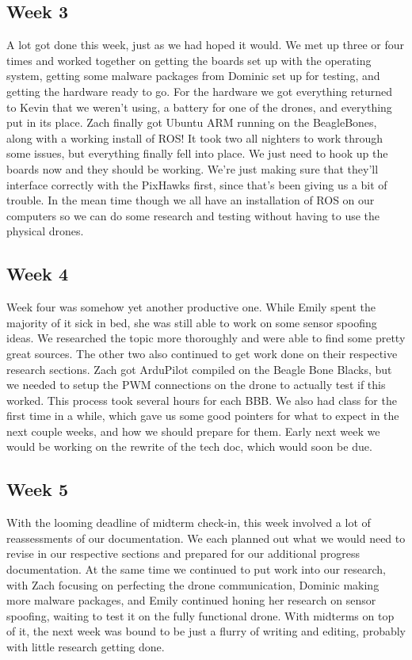 \documentclass[IEEEtran,letterpaper,10pt,notitlepage,draftclsnofoot,onecolumn]{article}
\begin{document}
\subsection{Week 3}
A lot got done this week, just as we had hoped it would. 
We met up three or four times and worked together on getting the boards set up with the operating system, getting some malware packages from Dominic set up for testing, and getting the hardware ready to go. 
For the hardware we got everything returned to Kevin that we weren't using, a battery for one of the drones, and everything put in its place.
Zach finally got Ubuntu ARM running on the BeagleBones, along with a working install of ROS! It took two all nighters to work through some issues, but everything finally fell into place.  
We just need to hook up the boards now and they should be working. 
We're just making sure that they'll interface correctly with the PixHawks first, since that's been giving us a bit of trouble. 
In the mean time though we all have an installation of ROS on our computers so we can do some research and testing without having to use the physical drones. 

\subsection{Week 4}
Week four was somehow yet another productive one. 
While Emily spent the majority of it sick in bed, she was still able to work on some sensor spoofing ideas. 
We researched the topic more thoroughly and were able to find some pretty great sources. 
The other two also continued to get work done on their respective research sections. 
Zach got ArduPilot compiled on the Beagle Bone Blacks, but we needed to setup the PWM connections on the drone to actually test if this worked. 
This process took several hours for each BBB.
We also had class for the first time in a while, which gave us some good pointers for what to expect in the next couple weeks, and how we should prepare for them. 
Early next week we would be working on the rewrite of the tech doc, which would soon be due.

\subsection{Week 5}
With the looming deadline of midterm check-in, this week involved a lot of reassessments of our documentation. 
We each planned out what we would need to revise in our respective sections and prepared for our additional progress documentation. 
At the same time we continued to put work into our research, with Zach focusing on perfecting the drone communication, Dominic making more malware packages, and Emily continued honing her research on sensor spoofing, waiting to test it on the fully functional drone. 
With midterms on top of it, the next week was bound to be just a flurry of writing and editing, probably with little research getting done.
\end{document}
